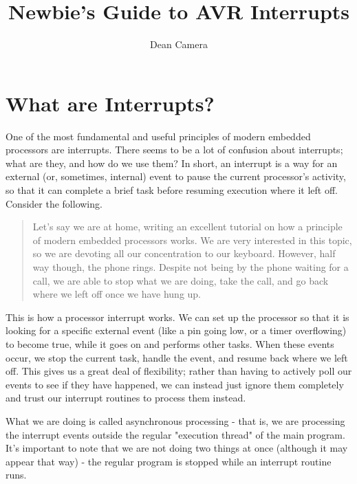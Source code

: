 \documentclass[a4paper,oneside,notitlepage]{book}
\begin{document}
\title{Newbie's Guide to AVR Interrupts}
\author{Dean Camera}
\maketitle



\cleardoublepage
\tableofcontents
\cleardoublepage


\label{chp:WhatAreInts}
\chapter{What are Interrupts?}

One of the most fundamental and useful principles of modern embedded processors are interrupts. There seems to be a lot of confusion about interrupts; what are they, and how do we use them? In short, an interrupt is a way for an external (or, sometimes, internal) event to pause the current processor's activity, so that it can complete a brief task before resuming execution where it left off. Consider the following.

\begin{quote}
Let's say we are at home, writing an excellent tutorial on how a principle of modern embedded processors works. We are very interested in this topic, so we are devoting all our concentration to our keyboard. However, half way though, the phone rings. Despite not being by the phone waiting for a call, we are able to stop what we are doing, take the call, and go back where we left off once we have hung up.
\end{quote}

This is how a processor interrupt works. We can set up the processor so that it is looking for a specific external event (like a pin going low, or a timer overflowing) to become true, while it goes on and performs other tasks. When these events occur, we stop the current task, handle the event, and resume back where we left off. This gives us a great deal of flexibility; rather than having to actively poll our events to see if they have happened, we can instead just ignore them completely and trust our interrupt routines to process them instead.

What we are doing is called asynchronous processing - that is, we are processing the interrupt events outside the regular "execution thread" of the main program. It's important to note that we are not doing two things at once (although it may appear that way) - the regular program is stopped while an interrupt routine runs.
\end{document}
